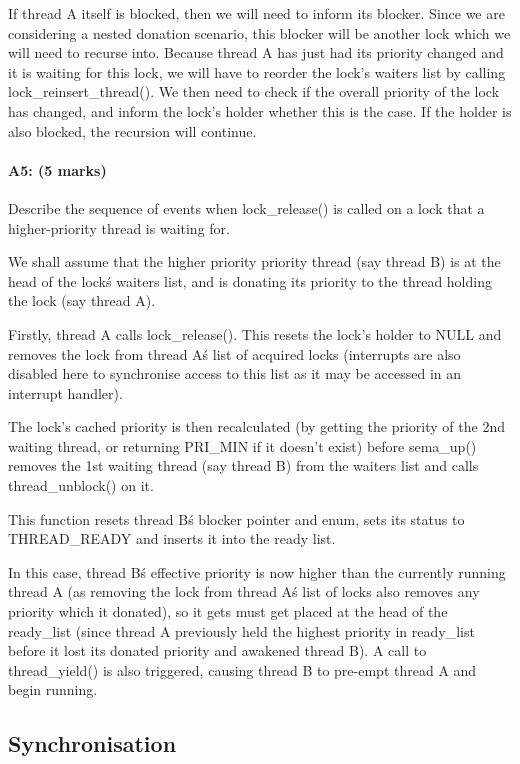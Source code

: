 If thread A itself is blocked, then we will need to inform its blocker. Since we are considering a nested donation scenario, this blocker will be another lock which we will need to recurse into. Because thread A has just had its priority changed and it is waiting for this lock, we will have to reorder the lock's waiters list by calling lock_reinsert_thread(). We then need to check if the overall priority of the lock has changed, and inform the lock's holder whether this is the case. If the holder is also blocked, the recursion will continue.

\paragraph{A5: (5 marks)}
Describe the sequence of events when lock\_release() is called on a lock that a higher-priority thread is waiting for.

We shall assume that the higher priority priority thread (say thread B) is at the head of the lock\'s waiters list, and is donating its priority to the thread holding the lock (say thread A).

Firstly, thread A calls lock\_release(). This resets the lock's holder to NULL and removes the lock from thread A\'s list of acquired locks (interrupts are also disabled here to synchronise access to this list as it may be accessed in an interrupt handler).

The lock's cached priority is then recalculated (by getting the priority of the 2nd waiting thread, or returning PRI\_MIN if it doesn't exist) before sema\_up() removes the 1st waiting thread (say thread B) from the waiters list and calls thread\_unblock() on it.

This function resets thread B\'s blocker pointer and enum, sets its status to THREAD\_READY and inserts it into the ready list.

In this case, thread B\'s effective priority is now higher than the currently running thread A (as removing the lock from thread A\'s list of locks also removes any priority which it donated), so it gets must get placed at the head of the ready\_list (since thread A previously held the highest priority in ready\_list before it lost its donated priority and awakened thread B). A call to thread\_yield() is also triggered, causing thread B to pre-empt thread A and begin running.

\subsection{Synchronisation}

